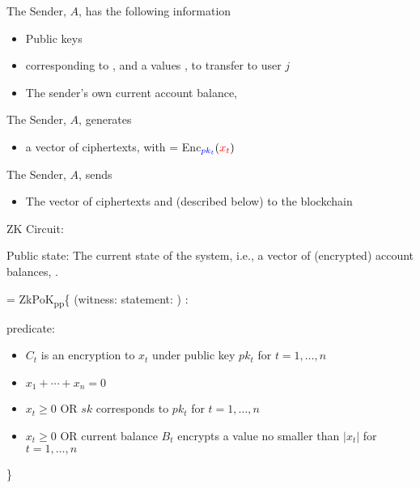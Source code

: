 The Sender, $A$, has the following information
	\begin{itemize}
    \item Public keys 
    \item {} corresponding to , and a values , to transfer to user $j$
    \item The sender's own current account balance, 
	\end{itemize}

The Sender, $A$, generates
	\begin{itemize}
    \item a vector of ciphertexts,  with  = Enc$_{\blue{pk_t}}(\red{x_t})$
	\end{itemize}

The Sender, $A$, sends
	\begin{itemize}
    \item The vector of ciphertexts  and  (described below) to the blockchain
	\end{itemize}

ZK Circuit: 

Public state: The current state of the system, i.e., a vector of (encrypted) account balances, .

   = ZkPoK\textsubscript{pp}\{  (witness:  statement:  ) :

\hspace{1em}predicate: 
\begin{itemize}
\item $C_t$ is an encryption to $x_t$ under public key $pk_t$ for $t=1,\ldots,n$
\item $x_1 + \cdots + x_n = 0$
\item $x_t \geq 0$ OR $sk$ corresponds to $pk_t$ for $t = 1,\ldots,n$
\item $x_t \geq 0$ OR current balance $B_t$ encrypts a value no smaller than $|x_t|$ for $t = 1,\ldots,n$
\end{itemize}
\}
